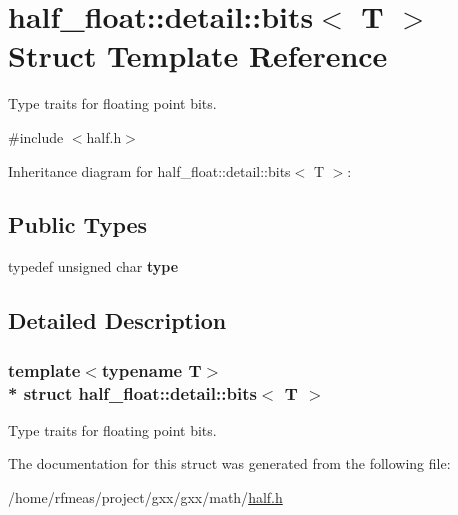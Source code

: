 \hypertarget{structhalf__float_1_1detail_1_1bits}{}\section{half\+\_\+float\+:\+:detail\+:\+:bits$<$ T $>$ Struct Template Reference}
\label{structhalf__float_1_1detail_1_1bits}


Type traits for floating point bits.  




{\ttfamily \#include $<$half.\+h$>$}



Inheritance diagram for half\+\_\+float\+:\+:detail\+:\+:bits$<$ T $>$\+:
\subsection*{Public Types}
\begin{DoxyCompactItemize}
\item 
typedef unsigned char {\bfseries type}\hypertarget{structhalf__float_1_1detail_1_1bits_a6087f39bed27f25b3be91078a4a6dbdc}{}\label{structhalf__float_1_1detail_1_1bits_a6087f39bed27f25b3be91078a4a6dbdc}

\end{DoxyCompactItemize}


\subsection{Detailed Description}
\subsubsection*{template$<$typename T$>$\\*
struct half\+\_\+float\+::detail\+::bits$<$ T $>$}

Type traits for floating point bits. 

The documentation for this struct was generated from the following file\+:\begin{DoxyCompactItemize}
\item 
/home/rfmeas/project/gxx/gxx/math/\hyperlink{half_8h}{half.\+h}\end{DoxyCompactItemize}
